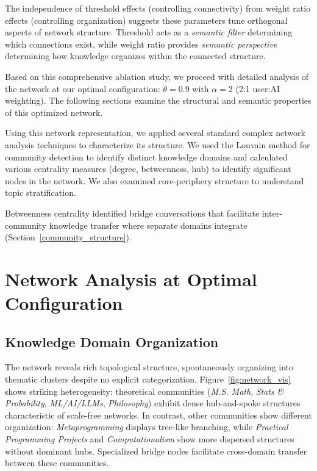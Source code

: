 \documentclass{svproc}
\begin{document}
The independence of threshold effects (controlling connectivity) from weight ratio effects (controlling organization) suggests these parameters tune orthogonal aspects of network structure. Threshold acts as a \emph{semantic filter} determining which connections exist, while weight ratio provides \emph{semantic perspective} determining how knowledge organizes within the connected structure.

Based on this comprehensive ablation study, we proceed with detailed analysis of the network at our optimal configuration: $\theta = 0.9$ with $\alpha = 2$ (2:1 user:AI weighting). The following sections examine the structural and semantic properties of this optimized network.

Using this network representation, we applied several standard complex network analysis techniques to characterize its structure. We used the Louvain method \cite{blondel2008} for community detection to identify distinct knowledge domains and calculated various centrality measures (degree, betweenness, hub) to identify significant nodes in the network. We also examined core-periphery structure to understand topic stratification.

Betweenness centrality identified bridge conversations that facilitate inter-community knowledge transfer where separate domains integrate (Section~\ref{community_structure}).

\section{Network Analysis at Optimal Configuration}

\subsection{Knowledge Domain Organization}

The network reveals rich topological structure, spontaneously organizing into thematic clusters despite no explicit categorization. Figure~\ref{fig:network_vis} shows striking heterogeneity: theoretical communities (\emph{M.S. Math}, \emph{Stats \& Probability}, \emph{ML/AI/LLMs}, \emph{Philosophy}) exhibit dense hub-and-spoke structures characteristic of scale-free networks. In contrast, other communities show different organization: \emph{Metaprogramming} displays tree-like branching, while \emph{Practical Programming Projects} and \emph{Computationalism} show more dispersed structures without dominant hubs. Specialized bridge nodes facilitate cross-domain transfer between these communities.
\end{document}
